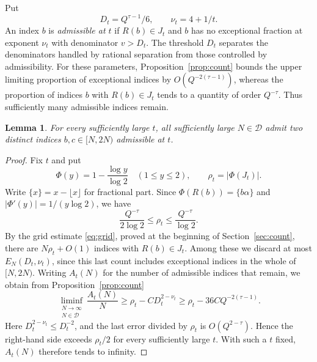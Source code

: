 \documentclass[11pt,reqno]{amsart}
\newtheorem{lemma}{Lemma}[section]
\theoremstyle{definition}
\newcommand{\N}{\mathbb N}
\newcommand{\DD}{\mathcal D}
\begin{document}
Put
\[
 D_t=Q^{\tau-1}/6,\qquad \nu_t=4+1/t.
\]
An index $b$ is \emph{admissible at $t$} if $R(b)\in J_t$
and $b$ has no exceptional fraction at exponent $\nu_t$
with denominator $v>D_t$. The threshold $D_t$ separates the denominators handled
by rational separation from those controlled by admissibility. 
For these parameters, Proposition~\ref{prop:count} bounds
the upper limiting proportion of exceptional indices by
$O(Q^{-2(\tau-1)})$, whereas the proportion of indices $b$
with $R(b)\in J_t$ tends to a quantity of order $Q^{-\tau}$.
Thus sufficiently many admissible indices remain.

\begin{lemma}\label{lem:choice}
For every sufficiently large $t$, all sufficiently large $N\in\DD$
admit two distinct indices $b,c\in[N,2N)$ admissible at $t$.
\end{lemma}

\begin{proof}
Fix $t$ and put
\[
 \Phi(y)=1-\frac{\log y}{\log2}
 \quad(1\le y\le2),\qquad
 \rho_t=|\Phi(J_t)|.
\]
Write $\{x\}=x-\lfloor x\rfloor$ for fractional part. Since
$\Phi(R(b))=\{b\alpha\}$ and $|\Phi'(y)|=1/(y\log2)$, we have
\[
 \frac{Q^{-\tau}}{2\log2}\le\rho_t\le\frac{Q^{-\tau}}{\log2}.
\]
By the grid estimate \eqref{eq:grid}, proved at the beginning
of Section~\ref{sec:count}, there are $N\rho_t+O(1)$ indices
with $R(b)\in J_t$. Among these we discard at most $E_N(D_t,\nu_t)$,
since this last count includes exceptional indices in the whole of
$[N,2N)$. Writing $A_t(N)$ for the number of admissible indices
that remain, we obtain from Proposition~\ref{prop:count}
\[
 \liminf_{\substack{N\to\infty\\N\in\DD}}\frac{A_t(N)}{N}
 \ge \rho_t-C D_t^{2-\nu_t}\ge\rho_t-36C Q^{-2(\tau-1)}.
\]
Here $D_t^{2-\nu_t}\le D_t^{-2}$, and the last error divided
by $\rho_t$ is $O(Q^{2-\tau})$. Hence the right-hand side exceeds
$\rho_t/2$ for every sufficiently large $t$. With such a $t$ fixed,
$A_t(N)$ therefore tends to infinity.
\end{proof}
\end{document}
